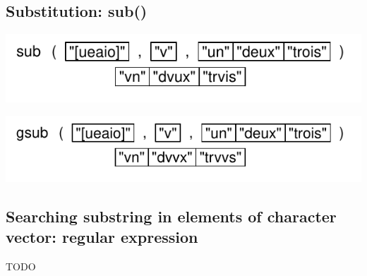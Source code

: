\documentclass[pdflatex]{article}
\begin{document}
\subsection{Substitution: sub()}

\includegraphics{sub}

\includegraphics{gsub}

\subsection{Searching substring in elements of character vector: regular expression}

TODO


%
% 



% 
% 
% 
% 
% 
% 
% 
% 
% 
% 
\end{document}

